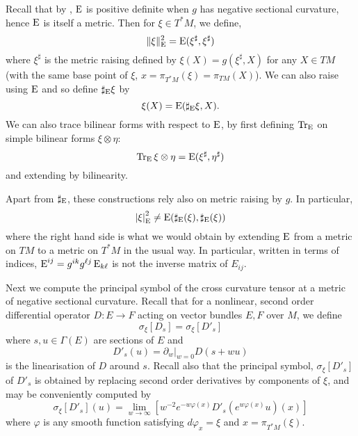 \documentclass[a4paper, 12pt]{amsart}
\begin{document}
Recall that by , \(\operatorname{E}\) is positive definite when \(g\) has negative sectional curvature, hence \(\operatorname{E}\) is itself a metric. Then for \(\xi \in T^{\ast} M\), we define,
\[
\|\xi\|_{\operatorname{E}}^2 = \operatorname{E}(\xi^{\sharp}, \xi^{\sharp})
\]
where \(\xi^{\sharp}\) is the metric raising defined by \(\xi(X) = g(\xi^{\sharp}, X)\) for any \(X \in TM\) (with the same base point of \(\xi\), \(x = \pi_{T^{\ast}M} (\xi) = \pi_{TM} (X)\)). We can also raise using \(\operatorname{E}\) and so define \(\sharp_{\operatorname{E}} \xi\) by
\[
\xi(X) = \operatorname{E}(\sharp_{\operatorname{E}} \xi, X).
\]
We can also trace bilinear forms with respect to \(\operatorname{E}\), by first defining \(\operatorname{Tr}_{\operatorname{E}}\) on simple bilinear forms \(\xi \otimes \eta\):
\[
\operatorname{Tr}_{\operatorname{E}} \xi \otimes \eta = \operatorname{E}(\xi^{\sharp}, \eta^{\sharp})
\]
and extending by bilinearity.
\begin{rem}
Apart from \(\sharp_{\operatorname{E}}\), these constructions rely also on metric raising by \(g\). In particular,
\[
\left\lvert{\xi}\right\rvert^2_{\operatorname{E}} \ne \operatorname{E}(\sharp_{\operatorname{E}} (\xi), \sharp_{\operatorname{E}} (\xi))
\]
where the right hand side is what we would obtain by extending \(\operatorname{E}\) from a metric on \(TM\) to a metric on \(T^{\ast} M\) in the usual way. In particular, written in terms of indices, \(\operatorname{E}^{ij} = g^{ik}g^{\ell j} \operatorname{E}_{k\ell}\) is not the inverse matrix of \(E_{ij}\).
\end{rem}
Next we compute the principal symbol of the cross curvature tensor at a metric of negative sectional curvature. Recall that for a nonlinear, second order differential operator \(D : E \to F\) acting on vector bundles \(E, F\) over \(M\), we define
\begin{equation}
\label{eq:symbol}
\sigma_{\xi} [D_s] = \sigma_{\xi} [D'_s]
\end{equation}
where \(s, u \in \Gamma(E)\) are sections of \(E\) and
\[
D'_s (u) = \partial_w|_{w=0} D(s + w u)
\]
is the linearisation of \(D\) around \(s\). Recall also that the principal symbol, \(\sigma_{\xi} [D'_s]\) of \(D'_s\) is obtained by replacing second order derivatives by components of \(\xi\), and may be conveniently computed by
\begin{equation}
\label{eq:symbol_compute}
\sigma_{\xi} [D'_s] (u) = \lim_{w\to \infty} \left[w^{-2} e^{-w\varphi(x)} D'_s (e^{w\varphi(x)} u)(x)\right]
\end{equation}
where \(\varphi\) is any smooth function satisfying \(d\varphi_x = \xi\) and \(x = \pi_{T^{\ast}M} (\xi)\).
\end{document}
